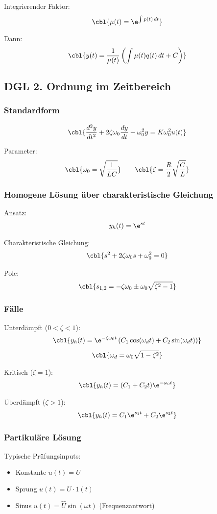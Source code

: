 Integrierender Faktor:
\[
\cbl{\mu(t) = \e^{\int p(t)\,dt}}
\]

Dann:
\[
\cbl{y(t) = \frac{1}{\mu(t)}\left(\int \mu(t) q(t)\,dt + C\right)}
\]

\subsection{DGL 2. Ordnung im Zeitbereich}

\subsubsection{Standardform}

\[
\cbl{\frac{d^2y}{dt^2} + 2\zeta\omega_0 \frac{dy}{dt} + \omega_0^2 y = K\omega_0^2 u(t)}
\]

Parameter:
\[
\cbl{\omega_0 = \sqrt{\frac{1}{LC}}}
\qquad
\cbl{\zeta = \frac{R}{2}\sqrt{\frac{C}{L}}}
\]

\subsubsection{Homogene Lösung über charakteristische Gleichung}

Ansatz:
\[
y_h(t)=\e^{st}
\]

Charakteristische Gleichung:
\[
\cbl{s^2 + 2\zeta\omega_0 s + \omega_0^2 = 0}
\]

Pole:
\[
\cbl{s_{1,2} = -\zeta\omega_0 \pm \omega_0\sqrt{\zeta^2-1}}
\]

\subsubsection{Fälle}

Unterdämpft ($0<\zeta<1$):
\[
\cbl{y_h(t)=\e^{-\zeta\omega_0 t}\left(C_1\cos(\omega_d t)+C_2\sin(\omega_d t)\right)}
\]
\[
\cbl{\omega_d = \omega_0\sqrt{1-\zeta^2}}
\]

Kritisch ($\zeta=1$):
\[
\cbl{y_h(t)=(C_1+C_2 t)\e^{-\omega_0 t}}
\]

Überdämpft ($\zeta>1$):
\[
\cbl{y_h(t)=C_1\e^{s_1 t}+C_2\e^{s_2 t}}
\]

\subsubsection{Partikuläre Lösung}

Typische Prüfungsinputs:
\begin{itemize}
    \item Konstante $u(t)=U$
    \item Sprung $u(t)=U\cdot 1(t)$
    \item Sinus $u(t)=\hat U\sin(\omega t)$ (Frequenzantwort)
\end{itemize}

